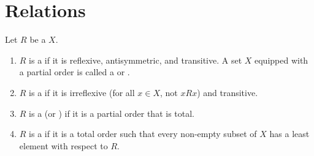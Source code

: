 





\section{Relations}





















\TODO{}
\begin{definition} 
Let $R$ be a  $X$.
\begin{enumerate}
    \item $R$ is a  if it is reflexive, antisymmetric, and transitive. A set $X$ equipped with a partial order is called a  or .
    \item $R$ is a  if it is irreflexive (for all $x \in X$, not $x R x$) and transitive.
    \item $R$ is a  (or ) if it is a partial order that is total.
    \item $R$ is a  if it is a total order such that every non-empty subset of $X$ has a least element with respect to $R$.
\end{enumerate}
\end{definition}



